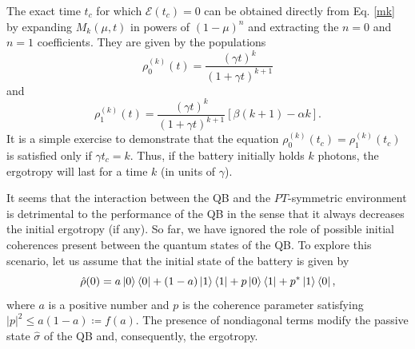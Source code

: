 \documentclass[%
reprint,
superscriptaddress,
amsmath,amssymb,
aps,
pra,
]{revtex4-2}
\begin{document}
The exact time $t_c$ for which $\mathcal{E}(t_c) = 0$ can be obtained directly from Eq. \eqref{mk} by expanding $M_k(\mu,t)$ in powers of $(1-\mu)^n$ and extracting the $n = 0$ and $n = 1$ coefficients. They are given by the populations
\begin{equation}
\rho_0^{(k)}(t) = \frac{(\gamma t)^k}{(1 + \gamma t)^{k+1}} 
\end{equation}
and
\begin{equation}
    \rho_1^{(k)}(t) = \frac{(\gamma t)^k}{(1+\gamma t)^{k+1}}[\beta(k+1) - \alpha k].
\end{equation}
It is a simple exercise to demonstrate that the equation $\rho_0^{(k)}(t_c) = \rho_1^{(k)}(t_c)$ is satisfied only if $\gamma t_c = k$. Thus, if the battery initially holds $k$ photons, the ergotropy will last for a time $k$ (in units of $\gamma$). 

It seems that the interaction between the QB and the $PT$-symmetric environment is detrimental to the performance of the QB in the sense that it always decreases the initial ergotropy (if any). So far, we have ignored the role of possible initial coherences present between the quantum states of the QB. To explore this scenario, let us assume that the initial state of the battery is given by
\begin{equation}
\hat{\rho}(0) = a\ket{0}\bra{0} + (1-a)\ket{1}\bra{1} + p\ket{0}\bra{1} + p^*\ket{1}\bra{0},
\end{equation}
where $a$ is a positive number and $p$ is the coherence parameter satisfying $|p|^2 \leq a(1-a)\coloneq f(a)$. The presence of nondiagonal terms modify the passive state $\hat{\sigma}$ of the QB and, consequently, the ergotropy.
\end{document}
